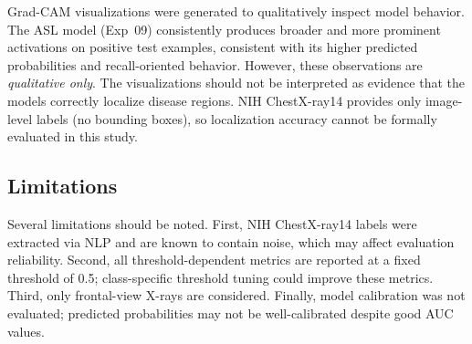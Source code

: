 Grad-CAM visualizations were generated to qualitatively inspect model behavior.
The ASL model (Exp~09) consistently produces broader and more prominent activations on positive test examples, consistent with its higher predicted probabilities and recall-oriented behavior.
However, these observations are \emph{qualitative only}.
The visualizations should not be interpreted as evidence that the models correctly localize disease regions.
NIH ChestX-ray14 provides only image-level labels (no bounding boxes), so localization accuracy cannot be formally evaluated in this study.

\subsection{Limitations}

Several limitations should be noted.
First, NIH ChestX-ray14 labels were extracted via NLP and are known to contain noise, which may affect evaluation reliability.
Second, all threshold-dependent metrics are reported at a fixed threshold of 0.5; class-specific threshold tuning could improve these metrics.
Third, only frontal-view X-rays are considered.
Finally, model calibration was not evaluated; predicted probabilities may not be well-calibrated despite good AUC values.
